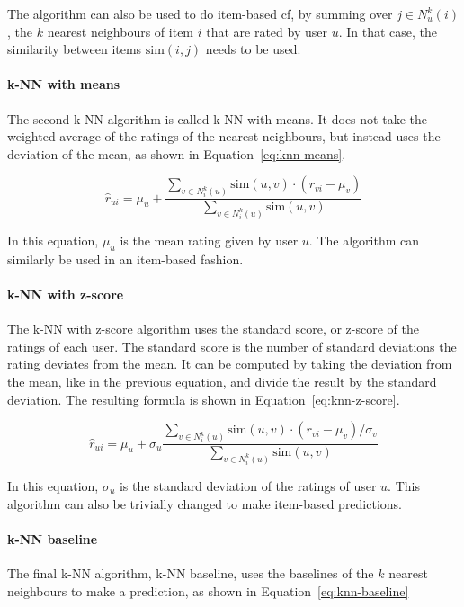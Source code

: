 The algorithm can also be used to do item-based \gls{cf}, by summing over $j \in N_u^k(i)$, the $k$ nearest neighbours of item $i$ that are rated by user $u$.
In that case, the similarity between items $\text{sim}(i,j)$ needs to be used.

\paragraph{k-NN with means}
The second k-NN algorithm is called k-NN with means.
It does not take the weighted average of the ratings of the nearest neighbours, but instead uses the deviation of the mean, as shown in Equation~\ref{eq:knn-means}.

\begin{equation}
    \label{eq:knn-means}
    \hat{r}_{ui} = \mu_u + \frac{\sum\limits_{v \in N_i^k(u)} \text{sim}(u, v) \cdot (r_{vi} - \mu_v) }{\sum\limits_{v \in N_i^k(u)} \text{sim}(u, v)}
\end{equation}

In this equation, $\mu_u$ is the mean rating given by user $u$.
The algorithm can similarly be used in an item-based fashion.

\paragraph{k-NN with z-score}
The k-NN with z-score algorithm uses the standard score, or z-score of the ratings of each user.
The standard score is the number of standard deviations the rating deviates from the mean.
It can be computed by taking the deviation from the mean, like in the previous equation, and divide the result by the standard deviation.
The resulting formula is shown in Equation~\ref{eq:knn-z-score}.

\begin{equation}
    \label{eq:knn-z-score}
    \hat{r}_{ui} = \mu_u + \sigma_u \frac{\sum\limits_{v \in N_i^k(u)} \text{sim}(u, v) \cdot (r_{vi} - \mu_v) / \sigma_v }{\sum\limits_{v \in N_i^k(u)} \text{sim}(u, v)}
\end{equation}

In this equation, $\sigma_u$ is the standard deviation of the ratings of user $u$.
This algorithm can also be trivially changed to make item-based predictions.

\paragraph{k-NN baseline}
The final k-NN algorithm, k-NN baseline, uses the baselines of the $k$ nearest neighbours to make a prediction, as shown in Equation~\ref{eq:knn-baseline}

